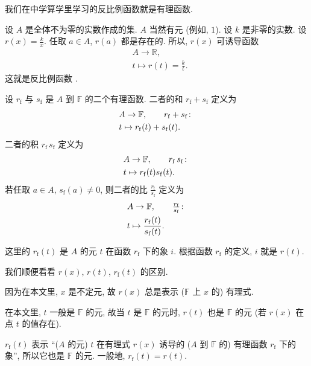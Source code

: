 我们在中学算学里学习的反比例函数就是有理函数.

\begin{example}
    设 $A$ 是全体不为零的实数作成的集. $A$ 当然有元 (例如, $1$). 设 $k$ 是非零的实数. 设 $r(x) = \frac{k}{x}$. 任取 $a \in A$, $r(a)$ 都是存在的. 所以, $r(x)$ 可诱导函数
    \begin{align*}
         & A \to \mathbb{R},             \\
         & t \mapsto r(t) = \frac{k}{t}.
    \end{align*}
    这就是反比例函数 .
\end{example}

\begin{definition}
    设 $r_\mathrm{f}$ 与 $s_\mathrm{f}$ 是 $A$ 到 $\mathbb{F}$ 的二个有理函数. 二者的和 $r_\mathrm{f} + s_\mathrm{f}$ 定义为
    \begin{align*}
         & A \to \mathbb{F}, \tag*{$r_\mathrm{f} + s_\mathrm{f} \colon$} \\
         & t \mapsto r_\mathrm{f} (t) + s_\mathrm{f} (t).
    \end{align*}
    二者的积 $r_\mathrm{f} \, s_\mathrm{f}$ 定义为
    \begin{align*}
         & A \to \mathbb{F}, \tag*{$r_\mathrm{f} \, s_\mathrm{f} \colon$} \\
         & t \mapsto r_\mathrm{f} (t) s_\mathrm{f} (t).
    \end{align*}
    若任取 $a \in A$, $s_\mathrm{f} (a) \neq 0$, 则二者的比 $\frac{r_\mathrm{f}}{s_\mathrm{f}}$ 定义为
    \begin{align*}
         & A \to \mathbb{F}, \tag*{$\frac{r_\mathrm{f}}{s_\mathrm{f}} \colon$} \\
         & t \mapsto \frac{r_\mathrm{f} (t)}{s_\mathrm{f} (t)}.
    \end{align*}
\end{definition}

\begin{remark}
    这里的 $r_{\mathrm{f}} (t)$ 是 $A$ 的元 $t$ 在函数 $r_{\mathrm{f}}$ 下的象 $i$. 根据函数 $r_{\mathrm{f}}$ 的定义, $i$ 就是 $r(t)$.

    我们顺便看看 $r(x)$, $r(t)$, $r_\mathrm{f} (t)$ 的区别.

    因为在本文里, $x$ 是不定元, 故 $r(x)$ 总是表示 ($\mathbb{F}$ 上 $x$ 的) 有理式.

    在本文里, $t$ 一般是 $\mathbb{F}$ 的元, 故当 $t$ 是 $\mathbb{F}$ 的元时, $r(t)$ 也是 $\mathbb{F}$ 的元 (若 $r(x)$ 在点 $t$ 的值存在).

    $r_\mathrm{f} (t)$ 表示 ``($A$ 的元) $t$ 在有理式 $r(x)$ 诱导的 ($A$ 到 $\mathbb{F}$ 的) 有理函数 $r_\mathrm{f}$ 下的象'', 所以它也是 $\mathbb{F}$ 的元. 一般地, $r_\mathrm{f} (t) = r(t)$.
\end{remark}

